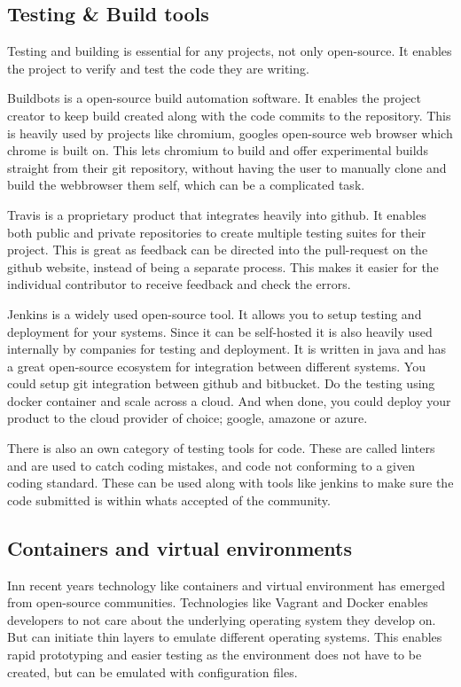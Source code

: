 \documentclass[12pt]{article}
\begin{document}
\subsection{Testing \& Build tools}
Testing and building is essential for any projects, not only open-source. It
enables the project to verify and test the code they are writing.

Buildbots is a open-source build automation software\cite{buildbot}. It enables the project
creator to keep build created along with the code commits to the repository.
This is heavily used by projects like chromium, googles open-source web browser
which chrome is built on. This lets chromium to build and offer experimental
builds straight from their git repository, without having the user to manually
clone and build the webbrowser them self, which can be a complicated task.

Travis is a proprietary product that integrates heavily into github\cite{travis}. It enables
both public and private repositories to create multiple testing suites for their
project. This is great as feedback can be directed into the pull-request on the
github website, instead of being a separate process. This makes it easier for
the individual contributor to receive feedback and check the errors.

Jenkins is a widely used open-source tool\cite{jenkins}. It allows you to setup testing and
deployment for your systems. Since it can be self-hosted it is also heavily used
internally by companies for testing and deployment. It is written in java and
has a great open-source ecosystem for integration between different systems. You
could setup git integration between github and bitbucket. Do the testing using
docker container and scale across a cloud. And when done, you could deploy your
product to the cloud provider of choice; google, amazone or azure.

There is also an own category of testing tools for code. These are called
linters and are used to catch coding mistakes, and code not conforming to a
given coding standard. These can be used along with tools like jenkins to make
sure the code submitted is within whats accepted of the community.


\subsection{Containers and virtual environments}
Inn recent years technology like containers and virtual environment has emerged
from open-source communities. Technologies like Vagrant and Docker enables
developers to not care about the underlying operating system they develop on.
But can initiate thin layers to emulate different operating systems. This
enables rapid prototyping and easier testing as the environment does not have to
be created, but can be emulated with configuration files.
\end{document}
